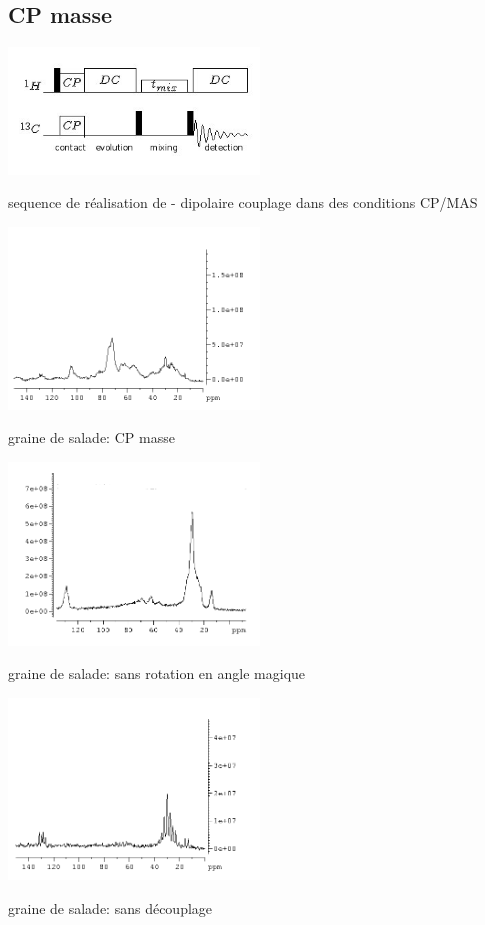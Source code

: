 \documentclass[a4paper,12pt]{scrartcl}
\begin{document}
  \subsection{CP masse}
 \begin{figurehere}
    \center
     \includegraphics[width=0.5\textwidth]{bilder/PDSD1.png}
     \caption{sequence de réalisation de  -  dipolaire couplage dans des conditions CP/MAS}
    \end{figurehere}
 \begin{figurehere}
    \center
    \includegraphics[width=0.5\textwidth]{bilder/graine_solide.png}
    \caption{graine de salade: CP masse}
   \end{figurehere}
 \begin{figurehere}
     \begin{minipage}{0.5\textwidth}
      \centering
     \includegraphics[width=0.5\textwidth]{bilder/graine_sans_rot.png}   
     \caption{graine de salade: sans rotation en angle magique}   
     \label{fig:sansrot}  
   \end{minipage}
   \hfill
   \begin{minipage}[H]{0.5\textwidth}
        \centering
       	\includegraphics[width=0.5\textwidth]{bilder/graine_sans_decouplage.png}
        \caption{graine de salade: sans découplage}
   \end{minipage}
    \end{figurehere}
\end{document}

